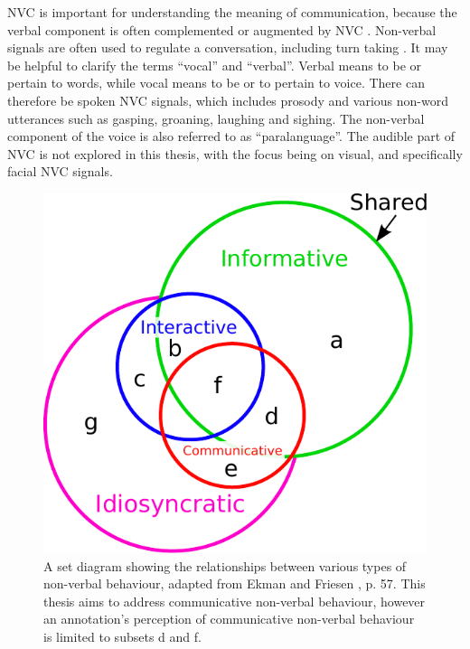 \ac{NVC} is important for understanding the meaning of communication, because the verbal component is often complemented or augmented by \ac{NVC} \cite{Archer1977, Knapp1978}. Non-verbal signals are often used to regulate a conversation, including turn taking \cite{Kendon1967, Avons1989}. It may be helpful to clarify the terms ``vocal'' and ``verbal''. Verbal means to be or pertain to words, while vocal means to be or to pertain to voice. There can therefore be spoken \ac{NVC} signals, which includes prosody and various non-word utterances such as gasping, groaning, laughing and sighing. The non-verbal component of the voice is also referred to as ``paralanguage''. The audible part of \ac{NVC} is not explored in this thesis, with the focus being on visual, and specifically facial \ac{NVC} signals.

\begin{figure}[tb]
\centering
\includegraphics[width = 0.6 \columnwidth]{litreview/EkmanNvb.pdf}
\caption[The relationships between various types of non-verbal behaviours]{A set diagram showing the relationships between various types of non-verbal behaviour, adapted from Ekman and Friesen \cite{Ekman1969}, p. 57. This thesis aims to address communicative non-verbal behaviour, however an annotation's perception of communicative non-verbal behaviour is limited to subsets d and f.}
\label{FigureEkmanNvb}
\end{figure}

